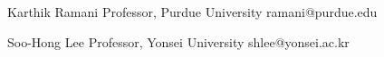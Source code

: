 


\begin{cvskills}


\cvskill
{Karthik Ramani} %
{Professor, Purdue University \hspace{5em} ramani@purdue.edu}

\cvskill
{Soo-Hong Lee} %
{Professor, Yonsei University \hspace{6em} shlee@yonsei.ac.kr}


\end{cvskills}

